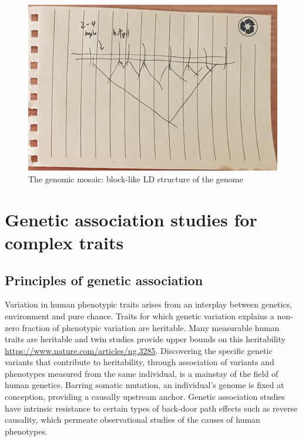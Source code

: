 \begin{outline}
\begin{figure}
    \centering
    \includegraphics[width=1.0\textwidth,page=1]{mainmatter/figures/chapter_01/fig_mockup_haplotypeBlocks_Screenshot 2020-05-21 at 17.08.33.png}
    \caption{The genomic mosaic: block-like \gls{LD} structure of the genome}
    \label{fig:intro_haplotypeBlocks}
\end{figure}

\section{Genetic association studies for complex traits}

\subsection{Principles of genetic association}

\1 Variation in human phenotypic traits arises from an interplay between genetics, environment and pure chance.
Traits for which genetic variation explains a non-zero fraction of phenotypic variation are heritable.
Many measurable human traits are heritable and twin studies provide upper bounds on this heritability \url{https://www.nature.com/articles/ng.3285}.
Discovering the specific genetic variants that contribute to heritability, through association of variants and phenotypes measured from the same individual, is a mainstay of the field of human genetics.
Barring somatic mutation, an individual's genome is fixed at conception, providing a causally upstream anchor.
Genetic association studies have intrinsic resistance to certain types of back-door path effects such as reverse causality, which permeate observational studies of the causes of human phenotypes.


\end{outline}
